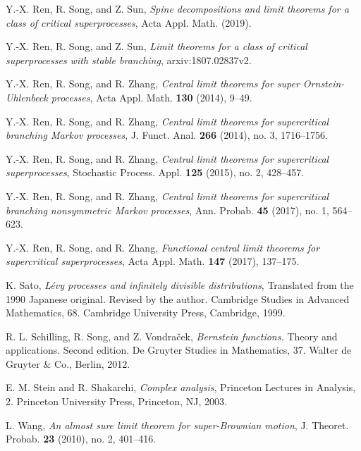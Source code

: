 \documentclass[EJP]{ejpecp} %
\begin{document}
\begin{thebibliography}{10}
  	Y.-X. Ren, R. Song, and Z. Sun,
  	\emph{Spine decompositions and limit theorems for a class of critical superprocesses},
  	Acta Appl. Math. (2019).

  	Y.-X. Ren, R. Song, and Z. Sun,
  	\emph{Limit theorems for a class of critical superprocesses with stable branching},
  	arxiv:1807.02837v2.

  	Y.-X. Ren, R. Song, and R. Zhang,
  	\emph{Central limit theorems for super {O}rnstein-{U}hlenbeck processes},
  	Acta Appl. Math. \textbf{130} (2014), 9--49.

  	Y.-X. Ren, R. Song, and R. Zhang,
  	\emph{Central limit theorems for supercritical branching {M}arkov processes},
  	J. Funct. Anal. \textbf{266} (2014), no. 3, 1716--1756.

  	Y.-X. Ren, R. Song, and R. Zhang,
  	\emph{Central limit theorems for supercritical superprocesses},
  	Stochastic Process. Appl. \textbf{125} (2015), no. 2, 428--457.

  	Y.-X. Ren, R. Song, and R. Zhang,
  	\emph{Central limit theorems for supercritical branching nonsymmetric {M}arkov processes},
  	Ann. Probab. \textbf{45} (2017), no. 1, 564--623.

  	Y.-X. Ren, R. Song, and R. Zhang,
  	\emph{Functional central limit theorems for supercritical superprocesses},
  	Acta Appl. Math. \textbf{147} (2017), 137--175.

  	K. Sato,
  	\emph{L{\'e}vy processes and infinitely divisible distributions},
  	Translated from the 1990 Japanese original. Revised by the author. Cambridge Studies in Advanced Mathematics, 68. Cambridge University Press, Cambridge, 1999.

  	R. L. Schilling, R. Song, and Z. Vondra\v{c}ek,
  	\emph{Bernstein functions.}
  	Theory and applications. Second edition. De Gruyter Studies in Mathematics, 37. Walter de Gruyter \& Co., Berlin, 2012.

  	E. M. Stein and R. Shakarchi,
  	\emph{Complex analysis},
  	Princeton Lectures in Analysis, 2. Princeton University Press, Princeton, NJ, 2003.

  	L. Wang,
  	\emph{An almost sure limit theorem for super-{B}rownian motion},
  	J. Theoret. Probab. \textbf{23} (2010), no. 2, 401--416.

\end{thebibliography}
\end{document}
